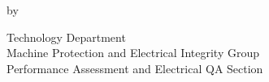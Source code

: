 \begin{titlepage}
    \hypertarget{titlepage}{} %
    \centering
    \vspace*{1cm}

    \LARGE
    \thetitle

    \Large
    \vspace{0.5cm}

    by

    \vspace{0.5cm}
    \theauthor

    \vfill

    \vspace{0.8cm}
    

    \Large
    Technology Department\\
    Machine Protection and Electrical Integrity Group\\
    Performance Assessment and Electrical QA Section\\
    \thedate
    \vspace*{1cm}
\end{titlepage}